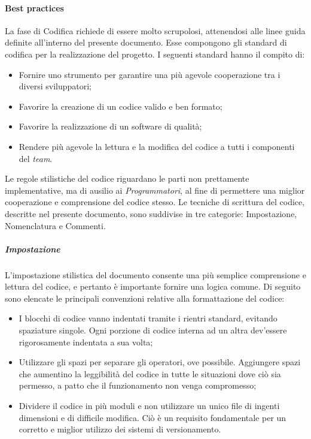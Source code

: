 		\paragraph{Best practices}
		La fase di Codifica richiede di essere molto scrupolosi, attenendosi alle linee guida definite all'interno del presente documento. Esse compongono gli standard di codifica per la realizzazione del progetto. I seguenti standard hanno il compito di:
		\begin{itemize}
			\item Fornire uno strumento per garantire una più agevole cooperazione tra i diversi sviluppatori;
			\item Favorire la creazione di un codice valido e ben formato;
			\item Favorire la realizzazione di un software di qualità;
			\item Rendere più agevole la lettura e la modifica del codice a tutti i componenti del \textit{team}.
		\end{itemize}
		Le regole stilistiche del codice riguardano le parti non prettamente implementative, ma di ausilio ai \textit{Programmatori}, al fine di permettere una miglior cooperazione e comprensione del codice stesso. Le tecniche di scrittura del codice, descritte nel presente documento, sono suddivise in tre categorie: Impostazione, Nomenclatura e Commenti.
	
			\subparagraph{Impostazione}
			L'impostazione stilistica del documento consente una più semplice comprensione e lettura del codice, e pertanto è importante fornire una logica comune. Di seguito sono elencate le principali convenzioni relative alla formattazione del codice: 
			\begin{itemize}
				\item I blocchi di codice vanno indentati tramite i rientri standard, evitando spaziature singole. Ogni porzione di codice interna ad un altra dev'essere rigorosamente indentata a sua volta;
				\item Utilizzare gli spazi per separare gli operatori, ove possibile. Aggiungere spazi che aumentino la leggibilità del codice in tutte le situazioni dove ciò sia permesso, a patto che il funzionamento non venga compromesso;
				\item Dividere il codice in più moduli e non utilizzare un unico file di ingenti dimensioni e di difficile modifica. Ciò è un requisito fondamentale per un corretto e miglior utilizzo dei sistemi di versionamento.
			\end{itemize}
	
